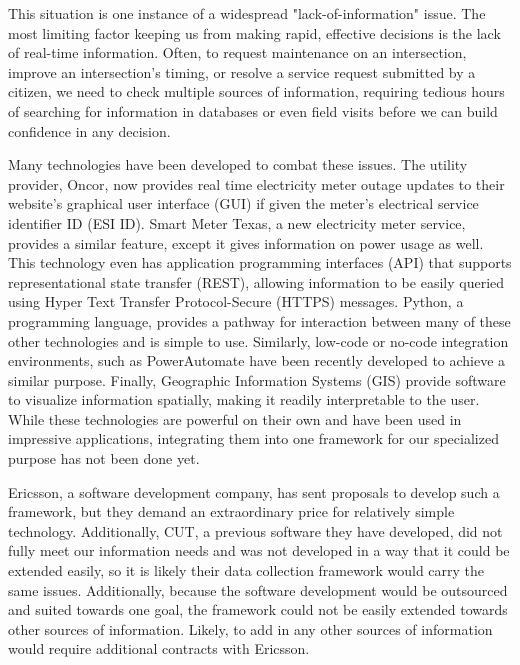 \documentclass[]{amsldoc}
\begin{document}
This situation is one instance of a widespread "lack-of-information" issue. The most limiting factor keeping us from making rapid, effective decisions is the lack of real-time information. Often, to request maintenance on an intersection, improve an intersection's timing, or resolve a service request submitted by a citizen, we need to check multiple sources of information, requiring tedious hours of searching for information in databases or even field visits before we can build confidence in any decision. 

Many technologies have been developed to combat these issues. The utility provider, Oncor, now provides real time electricity meter outage updates to their website's graphical user interface (GUI) if given the meter's electrical service identifier ID (ESI ID). Smart Meter Texas, a new electricity meter service, provides a similar feature, except it gives information on power usage as well. This technology even has application programming interfaces (API) that supports representational state transfer (REST), allowing information to be easily queried using Hyper Text Transfer Protocol-Secure (HTTPS) messages. Python, a programming language, provides a pathway for interaction between many of these other technologies and is simple to use. Similarly, low-code or no-code integration environments, such as PowerAutomate have been recently developed to achieve a similar purpose. Finally, Geographic Information Systems (GIS) provide software to visualize information spatially, making it readily interpretable to the user. While these technologies are powerful on their own and have been used in impressive applications, integrating them into one framework for our specialized purpose has not been done yet.

Ericsson, a software development company, has sent proposals to develop such a framework, but they demand an extraordinary price for relatively simple technology. Additionally, CUT, a previous software they have developed, did not fully meet our information needs and was not developed in a way that it could be extended easily, so it is likely their data collection framework would carry the same issues. Additionally, because the software development would be outsourced and suited towards one goal, the framework could not be easily extended towards other sources of information. Likely, to add in any other sources of information would require additional contracts with Ericsson.
\end{document}
